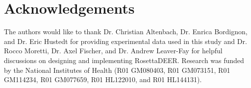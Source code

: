 \section{Acknowledgements}

The authors would like to thank Dr. Christian Altenbach, Dr. Enrica Bordignon, and Dr. Eric Hustedt for providing experimental data used in this study and Dr. Rocco Moretti, Dr. Axel Fischer, and Dr. Andrew Leaver-Fay for helpful discussions on designing and implementing RosettaDEER. Research was funded by the National Institutes of Health (R01 GM080403, R01 GM073151, R01 GM114234, R01 GM077659, R01 HL122010, and R01 HL144131).